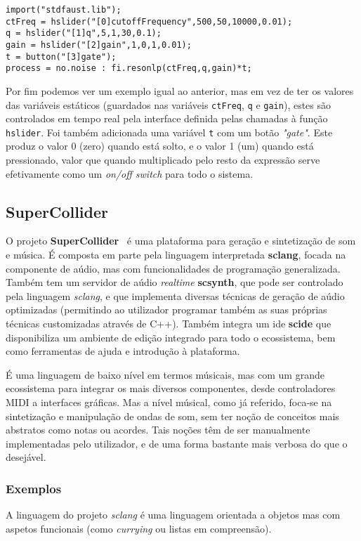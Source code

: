 \begin{lstlisting}[caption={Geração de ruído aleatório com um filtro \textit{low-pass} controlada por uma interface}]
import("stdfaust.lib");
ctFreq = hslider("[0]cutoffFrequency",500,50,10000,0.01);
q = hslider("[1]q",5,1,30,0.1);
gain = hslider("[2]gain",1,0,1,0.01);
t = button("[3]gate");
process = no.noise : fi.resonlp(ctFreq,q,gain)*t;
\end{lstlisting}
Por fim podemos ver um exemplo igual ao anterior, mas em vez de ter os valores das variáveis estáticos (guardados nas variáveis \texttt{ctFreq}, \texttt{q} e \texttt{gain}), estes são controlados em tempo real pela interface definida pelas chamadas à função \texttt{hslider}. Foi também adicionada uma variável \texttt{t} com um botão \textit{"gate"}. Este produz o valor 0 (zero) quando está solto, e o valor 1 (um) quando está pressionado, valor que quando multiplicado pelo resto da expressão serve efetivamente como um \textit{on/off switch} para todo o sistema.

\subsection{SuperCollider}
O projeto \textbf{SuperCollider}~\cite{doi:SuperCollider, orlarey:hal-02158894} é uma plataforma para geração e sintetização de som e música. É composta em parte pela linguagem interpretada \textbf{sclang}, focada na componente de aúdio, mas com funcionalidades de programação generalizada. Também tem um servidor de aúdio \textit{realtime} \textbf{scsynth}, que pode ser controlado pela linguagem \textit{sclang}, e que implementa diversas técnicas de geração de aúdio optimizadas (permitindo ao utilizador programar também as suas próprias técnicas customizadas através de C++). Também integra um \acrshort{ide} \textbf{scide} que disponibiliza um ambiente de edição integrado para todo o ecossistema, bem como ferramentas de ajuda e introdução à plataforma.

É uma linguagem de baixo nível em termos músicais, mas com um grande ecossistema para integrar os mais diversos componentes, desde controladores MIDI a interfaces gráficas. Mas a nível músical, como já referido, foca-se na sintetização e manipulação de ondas de som, sem ter noção de conceitos mais abstratos como notas ou acordes. Tais noções têm de ser manualmente implementadas pelo utilizador, e de uma forma bastante mais verbosa do que o desejável.

\subsubsection{Exemplos}
A linguagem do projeto \textit{sclang} é uma linguagem orientada a objetos mas com aspetos funcionais (como \textit{currying} ou listas em compreensão).

